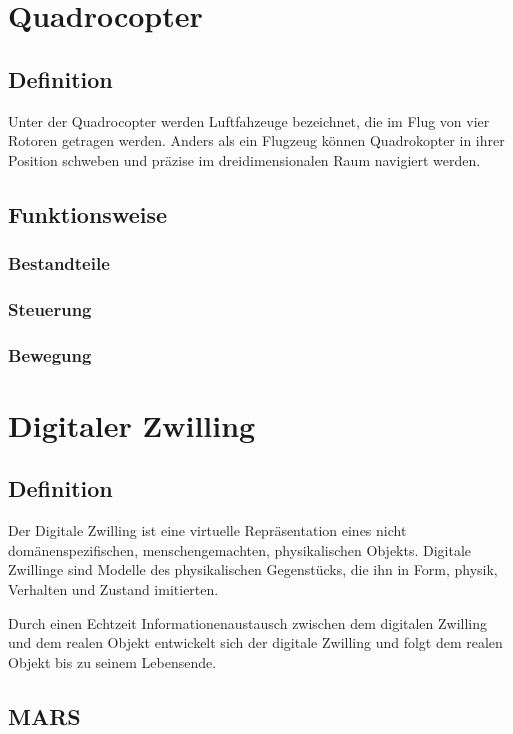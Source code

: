 \section{Quadrocopter}

\subsection{Definition}
Unter der Quadrocopter werden Luftfahzeuge bezeichnet, die im Flug von vier Rotoren getragen werden. Anders als ein Flugzeug können Quadrokopter in ihrer Position schweben und präzise im dreidimensionalen Raum navigiert werden. 

\subsection{Funktionsweise}
\subsubsection{Bestandteile}
\subsubsection{Steuerung}
\subsubsection{Bewegung}



\section{Digitaler Zwilling}
\subsection{Definition}

Der Digitale Zwilling ist eine virtuelle Repräsentation eines nicht domänenspezifischen, menschengemachten, physikalischen Objekts. Digitale Zwillinge sind Modelle des physikalischen Gegenstücks, die ihn in Form, physik, Verhalten und Zustand imitierten.  

Durch einen Echtzeit Informationenaustausch zwischen dem digitalen Zwilling und dem realen Objekt entwickelt sich der digitale Zwilling und folgt dem realen Objekt bis zu seinem Lebensende. 

\subsection{MARS}
  
